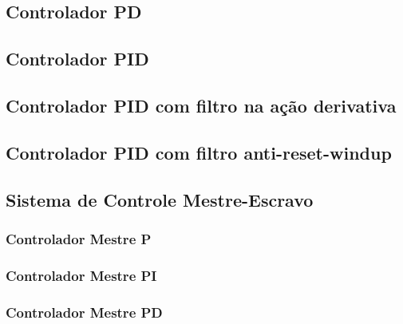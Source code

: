 \documentclass[a4paper,12pt]{article}
\begin{document}
\subsection{Controlador PD}\hspace{4ex}

\begin{figure}
\end{figure}

\subsection{Controlador PID}\hspace{4ex}

\subsection{Controlador PID com filtro na ação derivativa}\hspace{4ex}

\subsection{Controlador PID com filtro anti-reset-windup}\hspace{4ex}

\subsection{Sistema de Controle Mestre-Escravo}

\subsubsection{Controlador Mestre P}

\subsubsection{Controlador Mestre PI}

\subsubsection{Controlador Mestre PD}
\end{document}
